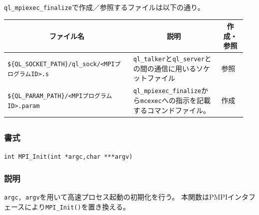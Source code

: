 \documentclass[twoside,11pt,fleqn]{book}
\begin{document}
\texttt{ql\_mpiexec\_finalize}で作成／参照するファイルは以下の通り。
\begin{table}[!ht]
\footnotesize
\begin{tabular}{|p{0.50\linewidth}|p{0.35\linewidth}|p{0.10\linewidth}|} \hline
\multicolumn{1}{|c}{\textbf{ファイル名}}&\multicolumn{1}{|c|}{\textbf{説明}}&\multicolumn{1}{c|}{\textbf{作成・参照}}\\ \hline 
 \hline
\texttt{\$\{QL\_SOCKET\_PATH\}/ql\_sock/<MPIプログラムID>.s}&\texttt{ql\_talker}と\texttt{ql\_server}との間の通信に用いるソケットファイル&参照\\ \hline
\texttt{\$\{QL\_PARAM\_PATH\}/<MPIプログラムID>.param}&\texttt{ql\_mpiexec\_finalize}から\texttt{mcexec}への指示を記載するコマンドファイル。&作成\\ \hline
\end{tabular}
\vspace{-0em}
\end{table}
\FloatBarrier

\subsection{}
\subsubsection*{書式}{\quad} \texttt{int MPI\_Init(int *argc,char ***argv)}
\subsubsection*{説明}{\quad}
\texttt{argc, argv}を用いて高速プロセス起動の初期化を行う。
本関数はPMPIインタフェースにより\texttt{MPI\_Init()}を置き換える。
\end{document}
